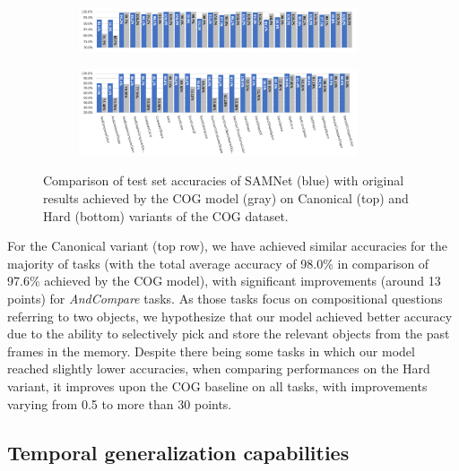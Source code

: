 \begin{figure}[!t]
	\centering
	\begin{subfigure}{\textwidth}
		\centering
		\includegraphics[width=0.9\textwidth]{img/results/samnet_cog_orig_canonical_no_labels.png}
	\end{subfigure}%
	\newline
	\begin{subfigure}{\textwidth}
		\centering
		\includegraphics[width=0.9\textwidth]{img/results/samnet_cog_orig_hard.png}
	\end{subfigure}%
	\caption{Comparison of test set accuracies of SAMNet (blue) with original results achieved by the COG model (gray) on Canonical (top) and Hard (bottom) variants of the COG dataset.}
	\label{fig:samnet_cog_detailed}
\end{figure}


For the Canonical variant (top row), we have achieved similar accuracies for the majority of tasks (with the total average accuracy of 98.0\% in comparison of 97.6\% achieved by the COG model), with significant improvements (around 13 points) for \textit{AndCompare} tasks.
As those tasks focus on compositional questions referring to two objects, we hypothesize that our model achieved better accuracy due to the ability to selectively pick and store the relevant objects from the past frames in the memory.
Despite there being some tasks in which our model reached slightly lower accuracies,
when comparing performances on the Hard variant, it improves upon the COG baseline on all tasks, with improvements varying from 0.5 to more than 30 points.

\subsection{Temporal generalization capabilities}

